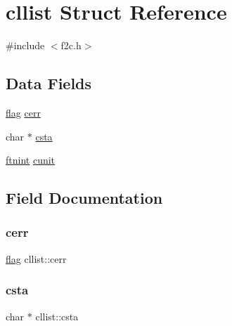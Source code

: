 \hypertarget{structcllist}{}\section{cllist Struct Reference}
\label{structcllist}


{\ttfamily \#include $<$f2c.\+h$>$}

\subsection*{Data Fields}
\begin{DoxyCompactItemize}
\item 
\hyperlink{dependencies_2third-party_2clapack_23_82_81_2_f2_c_l_i_b_s_2libf2c_2f2c_8h_abf5d144da384425ae6cb542ce6eec8d3}{flag} \hyperlink{structcllist_afce750ad0c1a89568d816ee4c2c40333}{cerr}
\item 
char $\ast$ \hyperlink{structcllist_ac171ed567c9f24abf2fcb792cf716fa4}{csta}
\item 
\hyperlink{dependencies_2third-party_2clapack_23_82_81_2_f2_c_l_i_b_s_2libf2c_2f2c_8h_a9d70cdb573fb2bf020e1f6dba85fb1cc}{ftnint} \hyperlink{structcllist_a5ecb27d52d6d1cdccf23f00e6586e4ff}{cunit}
\end{DoxyCompactItemize}


\subsection{Field Documentation}
\mbox{\label{structcllist_afce750ad0c1a89568d816ee4c2c40333}} 
\subsubsection{\texorpdfstring{cerr}{cerr}}
{\footnotesize\ttfamily \hyperlink{dependencies_2third-party_2clapack_23_82_81_2_f2_c_l_i_b_s_2libf2c_2f2c_8h_abf5d144da384425ae6cb542ce6eec8d3}{flag} cllist\+::cerr}

\mbox{\label{structcllist_ac171ed567c9f24abf2fcb792cf716fa4}} 
\subsubsection{\texorpdfstring{csta}{csta}}
{\footnotesize\ttfamily char $\ast$ cllist\+::csta}

